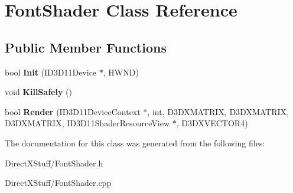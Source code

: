 \hypertarget{class_font_shader}{\section{Font\-Shader Class Reference}
\label{class_font_shader}
}
\subsection*{Public Member Functions}
\begin{DoxyCompactItemize}
\item 
\hypertarget{class_font_shader_a4bdf7f2b6e6803478438c1398ecca20c}{bool {\bfseries Init} (I\-D3\-D11\-Device $\ast$, H\-W\-N\-D)}\label{class_font_shader_a4bdf7f2b6e6803478438c1398ecca20c}

\item 
\hypertarget{class_font_shader_ad13416def5c3a21e024922696aa15441}{void {\bfseries Kill\-Safely} ()}\label{class_font_shader_ad13416def5c3a21e024922696aa15441}

\item 
\hypertarget{class_font_shader_a1f6ff28342ca225246a185514a17b54b}{bool {\bfseries Render} (I\-D3\-D11\-Device\-Context $\ast$, int, D3\-D\-X\-M\-A\-T\-R\-I\-X, D3\-D\-X\-M\-A\-T\-R\-I\-X, D3\-D\-X\-M\-A\-T\-R\-I\-X, I\-D3\-D11\-Shader\-Resource\-View $\ast$, D3\-D\-X\-V\-E\-C\-T\-O\-R4)}\label{class_font_shader_a1f6ff28342ca225246a185514a17b54b}

\end{DoxyCompactItemize}


The documentation for this class was generated from the following files\-:\begin{DoxyCompactItemize}
\item 
Direct\-X\-Stuff/Font\-Shader.\-h\item 
Direct\-X\-Stuff/Font\-Shader.\-cpp\end{DoxyCompactItemize}
